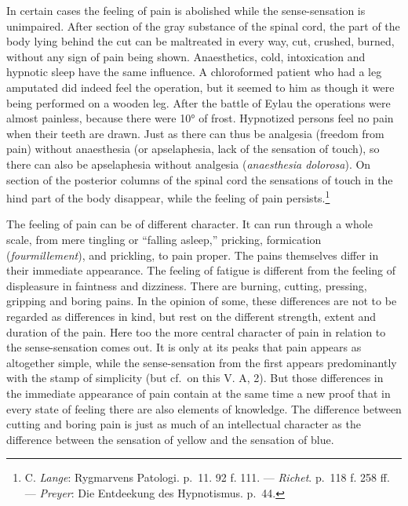 \documentclass[12pt,a4paper]{book}
\newcommand{\opage}[1]{\marginnote{\footnotesize\textit{[#1]}}}
\begin{document}
In certain cases the feeling of pain is abolished while the
sense-sensation is unimpaired. After section of the gray substance of
the spinal cord, the part of the body lying behind the cut can be
maltreated in every way, cut, crushed, burned, without any sign of pain
being shown. Anaesthetics, cold, intoxication and hypnotic sleep have
the same influence. A chloroformed patient who had a leg amputated did
indeed feel the operation, but it seemed to him as though it were being
performed on a wooden leg. After the battle of Eylau the operations were
almost painless, because there were 10° of frost. Hypnotized persons
feel no pain when their teeth are drawn. Just as there can thus be
analgesia (freedom from pain) without anaesthesia (or apselaphesia, lack
of the sensation of touch), so there can also be apselaphesia without
analgesia (\textit{anaesthesia dolorosa}). On section of the posterior
columns of the spinal cord the sensations of touch in the hind part of
the body disappear, while
the feeling of pain persists.\footnote{C. \emph{Lange}: Rygmarvens
Patologi. p.~11. 92 f. 111. --- \emph{Richet}. p.~118 f. 258 ff. ---
\emph{Preyer}: Die Entdeekung des Hypnotismus. p.~44.}

The feeling of pain can be of different character. It can run through a
whole scale, from mere tingling or ``falling asleep,'' pricking,
formication (\textit{fourmillement}), and prickling, to pain proper. The
pains themselves differ in their immediate appearance. The feeling of
fatigue is different from the feeling of displeasure in faintness and
dizziness. There are burning, cutting, pressing, gripping and boring
pains. In the opinion of some, these differences are not to be regarded
as differences in kind, but rest on the different strength, extent and
duration of the pain. Here too the more central character of pain in
relation to the sense-sensation comes out. It is only at its peaks that
pain appears as altogether simple, while the sense-sensation from the
first appears predominantly with the stamp of simplicity (but cf.\ on
this V. A, 2). But those
\opage{272}differences in the immediate appearance of pain contain at the
same time a new proof that in every state of feeling there are also
elements of knowledge. The difference between cutting and boring pain is
just as much of an intellectual character as the difference between the
sensation of yellow and the sensation of blue.
\end{document}
